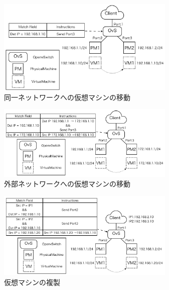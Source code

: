 \documentclass[a4paper, twocolumn]{jarticle}
\begin{document}
\begin{figure}[t]
	\includegraphics[width=8.5cm]{fig/migrate_flow.png}
	\caption{同一ネットワークへの仮想マシンの移動}
	\label{fig:migrate_flow}
\end{figure}
\begin{figure}[t]
	\includegraphics[width=8.5cm]{fig/migrate_flow_diff.png}
	\caption{外部ネットワークへの仮想マシンの移動}
	\label{fig:migrate_flow_diff}
\end{figure}
\begin{figure}[t]
	\includegraphics[width=8.5cm]{fig/clone_flow.png}
	\caption{仮想マシンの複製}
	\label{fig:clone_flow}
\end{figure}
\end{document}
